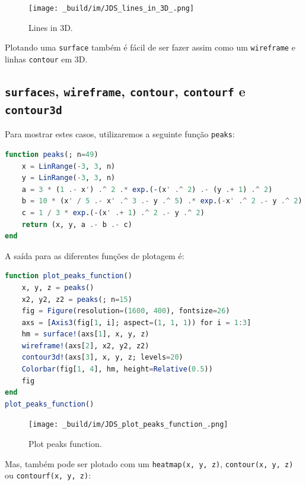 \documentclass[
  notoc %
]{tufte-book}
\newcommand{\passthrough}[1]{#1}
\begin{document}
\begin{figure}
\hypertarget{fig:lines_in_3D}{%
\centering
\texttt{[image: \_build/im/JDS\_lines\_in\_3D\_.png]}
\caption{Lines in 3D.}\label{fig:lines_in_3D}
}
\end{figure}

Plotando uma \passthrough{\lstinline!surface!} também é fácil de ser
fazer assim como um \passthrough{\lstinline!wireframe!} e linhas
\passthrough{\lstinline!contour!} em 3D.

\hypertarget{surfaces-wireframe-contour-contourf-e-contour3d}{%
\subsection{\texorpdfstring{\texttt{surface}s, \texttt{wireframe},
\texttt{contour}, \texttt{contourf} e
\texttt{contour3d}}{surfaces, wireframe, contour, contourf e contour3d}}\label{surfaces-wireframe-contour-contourf-e-contour3d}}

Para mostrar estes casos, utilizaremos a seguinte função
\passthrough{\lstinline!peaks!}:

\begin{lstlisting}[language=Julia]
function peaks(; n=49)
    x = LinRange(-3, 3, n)
    y = LinRange(-3, 3, n)
    a = 3 * (1 .- x') .^ 2 .* exp.(-(x' .^ 2) .- (y .+ 1) .^ 2)
    b = 10 * (x' / 5 .- x' .^ 3 .- y .^ 5) .* exp.(-x' .^ 2 .- y .^ 2)
    c = 1 / 3 * exp.(-(x' .+ 1) .^ 2 .- y .^ 2)
    return (x, y, a .- b .- c)
end
\end{lstlisting}

A saída para as diferentes funções de plotagem é:

\begin{lstlisting}[language=Julia]
function plot_peaks_function()
    x, y, z = peaks()
    x2, y2, z2 = peaks(; n=15)
    fig = Figure(resolution=(1600, 400), fontsize=26)
    axs = [Axis3(fig[1, i]; aspect=(1, 1, 1)) for i = 1:3]
    hm = surface!(axs[1], x, y, z)
    wireframe!(axs[2], x2, y2, z2)
    contour3d!(axs[3], x, y, z; levels=20)
    Colorbar(fig[1, 4], hm, height=Relative(0.5))
    fig
end
plot_peaks_function()
\end{lstlisting}

\begin{figure}
\hypertarget{fig:plot_peaks_function}{%
\centering
\texttt{[image: \_build/im/JDS\_plot\_peaks\_function\_.png]}
\caption{Plot peaks function.}\label{fig:plot_peaks_function}
}
\end{figure}

Mas, também pode ser plotado com um
\passthrough{\lstinline!heatmap(x, y, z)!},
\passthrough{\lstinline!contour(x, y, z)!} ou
\passthrough{\lstinline!contourf(x, y, z)!}:
\end{document}
